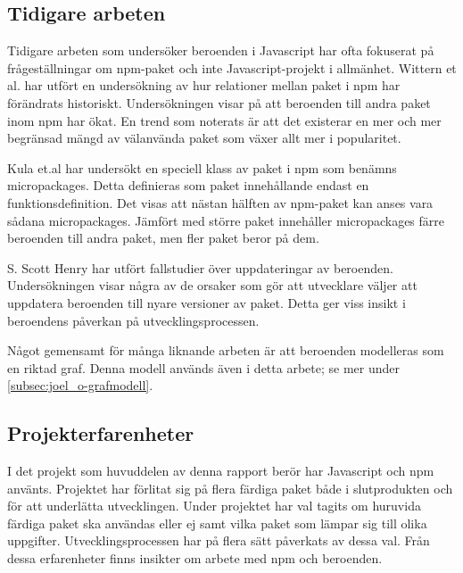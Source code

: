 \subsection{Tidigare arbeten}
Tidigare arbeten som undersöker beroenden i Javascript har ofta fokuserat på frågeställningar om npm-paket och inte Javascript-projekt i allmänhet. Wittern et al. har utfört en undersökning av hur relationer mellan paket i npm har förändrats historiskt. Undersökningen visar på att beroenden till andra paket inom npm har ökat. En trend som noterats är att det existerar en mer och mer begränsad mängd av välanvända paket som växer allt mer i popularitet. \cite{Wittern:2016}

Kula et.al har undersökt en speciell klass av paket i npm som benämns micropackages. Detta definieras som paket innehållande endast en funktionsdefinition. Det visas att nästan hälften av npm-paket kan anses vara sådana micropackages. Jämfört med större paket innehåller micropackages färre beroenden till andra paket, men fler paket beror på dem. \cite{Kula2017}

S. Scott Henry har utfört fallstudier över uppdateringar av beroenden. Undersökningen visar några av de orsaker som gör att utvecklare väljer att uppdatera beroenden till nyare versioner av paket. Detta ger viss insikt i beroendens påverkan på utvecklingsprocessen. \cite{Henry2017}

Något gemensamt för många liknande arbeten är att beroenden modelleras som en riktad graf. Denna modell används även i detta arbete; se mer under \ref{subsec:joel_o-grafmodell}.

\subsection{Projekterfarenheter}
I det projekt som huvuddelen av denna rapport berör har Javascript och npm använts. Projektet har förlitat sig på flera färdiga paket både i slutprodukten och för att underlätta utvecklingen. Under projektet har val tagits om huruvida färdiga paket ska användas eller ej samt vilka paket som lämpar sig till olika uppgifter. Utvecklingsprocessen har på flera sätt påverkats av dessa val. Från dessa erfarenheter finns insikter om arbete med npm och beroenden.
